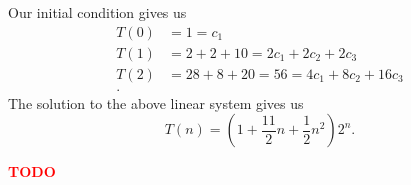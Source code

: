 Our initial condition gives us
\begin{align*}
    T(0) &= 1 = c_1 \\
    T(1) &= 2+2+10 = 2c_1 + 2c_2+2c_3 \\
    T(2) &= 28 + 8 + 20 = 56 = 4c_1 + 8c_2 + 16c_3 \\
.\end{align*}
The solution to the above linear system gives us \[
T(n) = \left( 1 + \frac{11}{2}n + \frac{1}{2}n^2 \right) 2^{n}
.\] 



\textbf{\textcolor{red}{TODO}}

